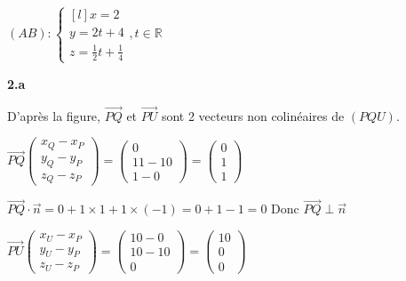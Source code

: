 \documentclass{article}
\begin{document}
$(AB):\left\{\begin{matrix*}[l]
x = 2\\
y = 2t + 4 \\
z = \frac{1}{2}t + \frac{1}{4}
\end{matrix*}
\right., t \in \mathbb{R}
$

\vspace{6mm}

\textbf{2.a}

\vspace{2mm}

\noindent D'après la figure, $\overrightarrow{PQ}$ et $\overrightarrow{PU}$ sont 2 vecteurs non colinéaires de $(PQU)$.

\vspace{2mm}

$\overrightarrow{PQ}\begin{pmatrix}
   x_Q-x_P\\
   y_Q-y_P\\
   z_Q-z_P
\end{pmatrix}
=
\begin{pmatrix}
   0\\
   11 - 10\\
   1 - 0
\end{pmatrix}
=
\begin{pmatrix}
   0\\
   1\\
   1
\end{pmatrix}
$

\vspace{2mm}

$\overrightarrow{PQ} \cdot \overrightarrow{n} = 0+1\times1+1\times(-1) = 0 + 1 - 1 = 0 $ \quad Donc $\overrightarrow{PQ} \perp \overrightarrow{n}$

\vspace{2mm}

$\overrightarrow{PU}\begin{pmatrix}
   x_U-x_P\\
   y_U-y_P\\
   z_U-z_P
\end{pmatrix}
=
\begin{pmatrix}
   10 - 0\\
   10 - 10\\
   0
\end{pmatrix}
=
\begin{pmatrix}
   10\\
   0\\
   0
\end{pmatrix}
$
\end{document}
